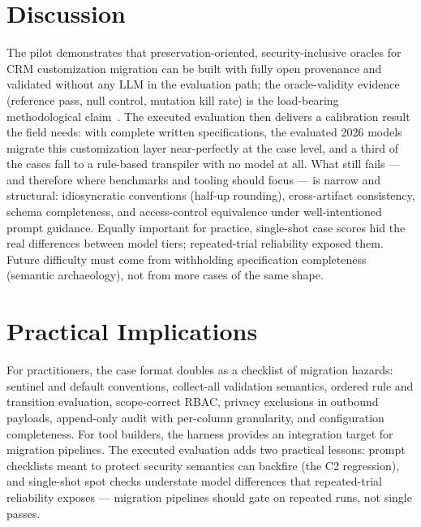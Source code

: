 \documentclass{ieeetj}
\begin{document}
\section{Discussion}
\label{sec:discussion}
The pilot demonstrates that preservation-oriented, security-inclusive oracles for CRM
customization migration can be built with fully open provenance and validated without any
LLM in the evaluation path; the oracle-validity evidence (reference pass, null control,
mutation kill rate) is the load-bearing methodological claim~\cite{liu2023evalplus,
zhu2025rigorous}. The executed evaluation then delivers a calibration result the field needs:
with complete written specifications, the evaluated 2026 models migrate this customization
layer near-perfectly at the case level, and a third of the cases fall to a rule-based
transpiler with no model at all. What still fails --- and therefore where benchmarks and tooling should
focus --- is narrow and structural: idiosyncratic conventions (half-up rounding),
cross-artifact consistency, schema completeness, and access-control equivalence under
well-intentioned prompt guidance. Equally important for practice, single-shot case scores hid
the real differences between model tiers; repeated-trial reliability exposed them. Future
difficulty must come from withholding specification completeness (semantic archaeology), not
from more cases of the same shape.

\section{Practical Implications}
\label{sec:implications}
For practitioners, the case format doubles as a checklist of migration hazards: sentinel and
default conventions, collect-all validation semantics, ordered rule and transition evaluation,
scope-correct RBAC, privacy exclusions in outbound payloads, append-only audit with per-column
granularity, and configuration completeness. For tool builders, the harness provides an
integration target for migration pipelines. The executed evaluation adds two practical
lessons: prompt checklists meant to protect security semantics can backfire (the C2
regression), and single-shot spot checks understate model differences that repeated-trial
reliability exposes --- migration pipelines should gate on repeated runs, not single passes.
\end{document}
